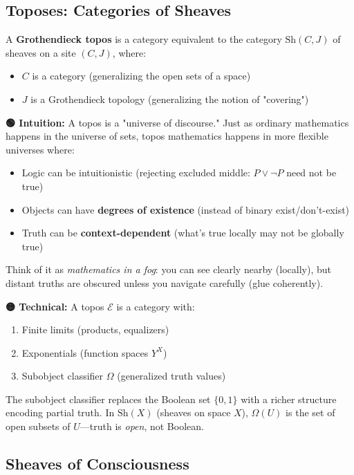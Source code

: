 \subsection{Toposes: Categories of Sheaves}

A \textbf{Grothendieck topos} is a category equivalent to the category $\text{Sh}(C, J)$ of sheaves on a site $(C, J)$, where:
\begin{itemize}
\item $C$ is a category (generalizing the open sets of a space)
\item $J$ is a Grothendieck topology (generalizing the notion of "covering")
\end{itemize}

\begin{greenbox}
\textbf{🟢 Intuition:} A topos is a "universe of discourse." Just as ordinary mathematics happens in the universe of sets, topos mathematics happens in more flexible universes where:
\begin{itemize}
\item Logic can be intuitionistic (rejecting excluded middle: $P \lor \neg P$ need not be true)
\item Objects can have \textbf{degrees of existence} (instead of binary exist/don't-exist)
\item Truth can be \textbf{context-dependent} (what's true locally may not be globally true)
\end{itemize}
Think of it as \textit{mathematics in a fog}: you can see clearly nearby (locally), but distant truths are obscured unless you navigate carefully (glue coherently).

\textbf{🟡 Technical:} A topos $\mathcal{E}$ is a category with:
\begin{enumerate}
\item Finite limits (products, equalizers)
\item Exponentials (function spaces $Y^X$)
\item Subobject classifier $\Omega$ (generalized truth values)
\end{enumerate}
The subobject classifier replaces the Boolean set $\{0, 1\}$ with a richer structure encoding partial truth. In $\text{Sh}(X)$ (sheaves on space $X$), $\Omega(U)$ is the set of open subsets of $U$—truth is \textit{open}, not Boolean.
\end{greenbox}

\subsection{Sheaves of Consciousness}

